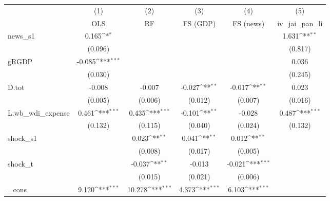 {
\def\sym#1{\ifmmode^{#1}\else\(^{#1}\)\fi}
\begin{tabular}{l*{5}{c}}
\toprule
            &\multicolumn{1}{c}{(1)}&\multicolumn{1}{c}{(2)}&\multicolumn{1}{c}{(3)}&\multicolumn{1}{c}{(4)}&\multicolumn{1}{c}{(5)}\\
            &\multicolumn{1}{c}{OLS}&\multicolumn{1}{c}{RF}&\multicolumn{1}{c}{FS (GDP)}&\multicolumn{1}{c}{FS (news)}&\multicolumn{1}{c}{iv\_jai\_pan\_li}\\
\midrule
news\_s1     &       0.165\sym{*}  &                     &                     &                     &       1.631\sym{**} \\
            &     (0.096)         &                     &                     &                     &     (0.817)         \\
\addlinespace
gRGDP       &      -0.085\sym{***}&                     &                     &                     &       0.036         \\
            &     (0.030)         &                     &                     &                     &     (0.245)         \\
\addlinespace
D.tot       &      -0.008         &      -0.007         &      -0.027\sym{**} &      -0.017\sym{**} &       0.023         \\
            &     (0.005)         &     (0.006)         &     (0.012)         &     (0.007)         &     (0.016)         \\
\addlinespace
L.wb\_wdi\_expense&       0.461\sym{***}&       0.435\sym{***}&      -0.101\sym{**} &      -0.028         &       0.487\sym{***}\\
            &     (0.132)         &     (0.115)         &     (0.040)         &     (0.024)         &     (0.132)         \\
\addlinespace
shock\_s1    &                     &       0.023\sym{**} &       0.041\sym{**} &       0.012\sym{**} &                     \\
            &                     &     (0.008)         &     (0.017)         &     (0.005)         &                     \\
\addlinespace
shock\_t     &                     &      -0.037\sym{**} &      -0.013         &      -0.021\sym{***}&                     \\
            &                     &     (0.015)         &     (0.021)         &     (0.006)         &                     \\
\addlinespace
\_cons      &       9.120\sym{***}&      10.278\sym{***}&       4.373\sym{***}&       6.103\sym{***}&                     \\

\end{tabular}}
